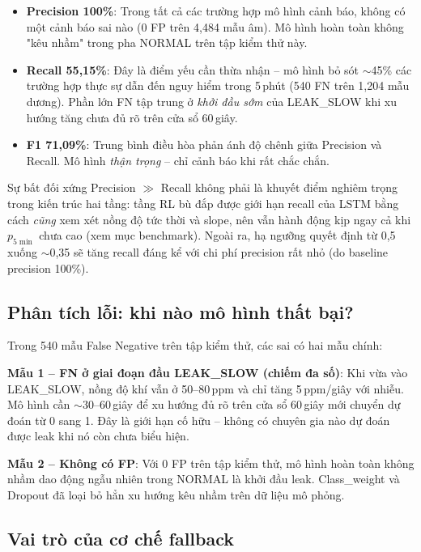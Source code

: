 \begin{itemize}
  \item \textbf{Precision 100\%}: Trong tất cả các trường hợp mô hình cảnh báo, không có một cảnh báo sai nào (0 FP trên 4{,}484 mẫu âm). Mô hình hoàn toàn không "kêu nhầm" trong pha NORMAL trên tập kiểm thử này.

  \item \textbf{Recall 55{,}15\%}: Đây là điểm yếu cần thừa nhận -- mô hình bỏ sót $\sim$45\% các trường hợp thực sự dẫn đến nguy hiểm trong 5\,phút (540 FN trên 1{,}204 mẫu dương). Phần lớn FN tập trung ở \textit{khởi đầu sớm} của LEAK\_SLOW khi xu hướng tăng chưa đủ rõ trên cửa sổ 60\,giây.

  \item \textbf{F1 71{,}09\%}: Trung bình điều hòa phản ánh độ chênh giữa Precision và Recall. Mô hình \textit{thận trọng} -- chỉ cảnh báo khi rất chắc chắn.
\end{itemize}

Sự bất đối xứng Precision $\gg$ Recall không phải là khuyết điểm nghiêm trọng trong kiến trúc hai tầng: tầng RL bù đắp được giới hạn recall của LSTM bằng cách \emph{cũng} xem xét nồng độ tức thời và slope, nên vẫn hành động kịp ngay cả khi $p_{5\min}$ chưa cao (xem mục benchmark). Ngoài ra, hạ ngưỡng quyết định từ 0{,}5 xuống $\sim$0{,}35 sẽ tăng recall đáng kể với chi phí precision rất nhỏ (do baseline precision 100\%).

\subsection{Phân tích lỗi: khi nào mô hình thất bại?}

Trong 540 mẫu False Negative trên tập kiểm thử, các sai có hai mẫu chính:

\textbf{Mẫu 1 -- FN ở giai đoạn đầu LEAK\_SLOW (chiếm đa số)}: Khi vừa vào LEAK\_SLOW, nồng độ khí vẫn ở 50--80\,ppm và chỉ tăng 5\,ppm/giây với nhiễu. Mô hình cần $\sim$30--60\,giây để xu hướng đủ rõ trên cửa sổ 60\,giây mới chuyển dự đoán từ 0 sang 1. Đây là giới hạn cố hữu -- không có chuyên gia nào dự đoán được leak khi nó còn chưa biểu hiện.

\textbf{Mẫu 2 -- Không có FP}: Với 0 FP trên tập kiểm thử, mô hình hoàn toàn không nhầm dao động ngẫu nhiên trong NORMAL là khởi đầu leak. Class\_weight và Dropout đã loại bỏ hẳn xu hướng kêu nhầm trên dữ liệu mô phỏng.

\subsection{Vai trò của cơ chế fallback}

